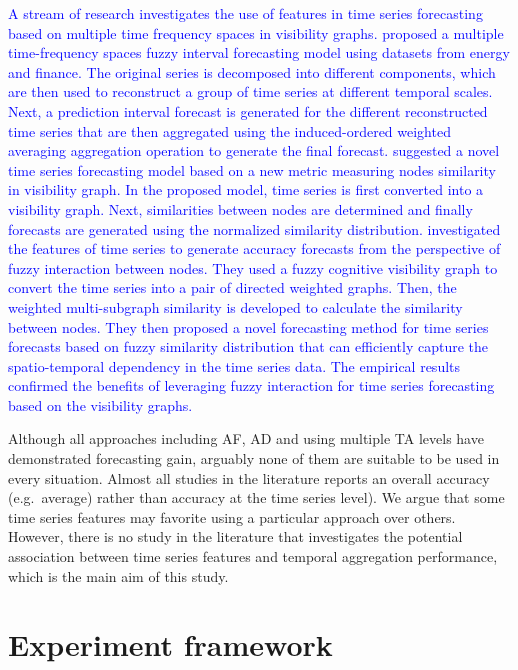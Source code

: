 \documentclass[preprint, 3p,
authoryear]{elsarticle} %
\begin{document}
\textcolor{blue}{A stream of research investigates the use of features in time series forecasting based on multiple time frequency spaces in visibility graphs.}
\citet{liu2020fuzzy}
\textcolor{blue}{proposed a multiple time-frequency spaces fuzzy interval forecasting model using datasets from energy and finance. The original series is decomposed into different components, which are then used to reconstruct a group of time series at different temporal scales. Next, a prediction interval forecast is generated for the different reconstructed time series that are then aggregated using the induced-ordered weighted averaging aggregation operation to generate the final forecast.}
\citet{hu2022efficient}
\textcolor{blue}{suggested a novel time series forecasting model based on a new metric measuring nodes similarity in visibility graph. In the proposed model, time series is first converted into a visibility graph. Next, similarities between nodes are determined and finally forecasts are generated using the normalized similarity distribution.}
\citet{hu2022time}
\textcolor{blue}{investigated the features of time series to generate accuracy forecasts from the perspective of fuzzy interaction between nodes. They used a fuzzy cognitive visibility graph to convert the time series into a pair of directed weighted graphs. Then, the weighted multi-subgraph similarity is developed to calculate the similarity between nodes. They then proposed a novel forecasting method for time series forecasts based on fuzzy similarity distribution that can efficiently capture the spatio-temporal dependency in the time series data. The empirical results confirmed the benefits of leveraging fuzzy interaction for time series forecasting based on the visibility graphs.}

Although all approaches including AF, AD and using multiple TA levels
have demonstrated forecasting gain, arguably none of them are suitable
to be used in every situation. Almost all studies in the literature
reports an overall accuracy (e.g.~average) rather than accuracy at the
time series level). We argue that some time series features may favorite
using a particular approach over others. However, there is no study in
the literature that investigates the potential association between time
series features and temporal aggregation performance, which is the main
aim of this study.

\hypertarget{framework}{%
\section{Experiment framework}\label{framework}}
\end{document}
